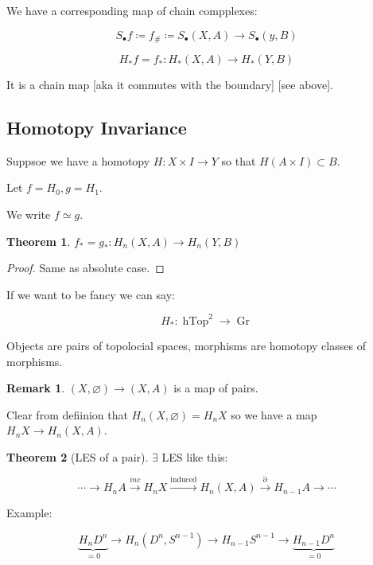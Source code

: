 \documentclass{article}
\theoremstyle{definition}
\newtheorem{theorem}{Theorem}
\newtheorem*{remark}{Remark}
\begin{document}
    We have a corresponding map of chain compplexes:

    \[
        S_\bullet f \coloneqq f_\# \coloneqq S_\bullet(X,A) \to S_\bullet(y,B)
    \]

    \[
        H_{\ast} f = f_{\ast} : H_{\ast} (X,A) \to H_{\ast} (Y,B)
    \]

    It is a chain map [aka it commutes with the boundary] [see above].

    \subsection*{Homotopy Invariance}

    Suppsoe we have a homotopy \(H: X \times I \to Y\) so that \(H(A \times I) \subset B\).
    
    Let \(f = H_0, g = H_1\).
    
    We write \(f\simeq g\).

    \begin{theorem}
        \(f_{\ast} = g_{\ast} : H_n(X,A) \to H_n(Y,B)\) 
    \end{theorem}

    \begin{proof}
        Same as absolute case.
    \end{proof}

    If we want to be fancy we can say:

    \[
        H_{\ast} : \operatorname{hTop}^2 \to \operatorname{Gr}  
    \]

    Objects are pairs of topolocial spaces, morphisms are homotopy classes of morphisms.

    \begin{remark}
        \((X,\varnothing) \to (X,A)\) is a map of pairs.

        Clear from defiinion that \(H_n (X,\varnothing) = H_n X\) so we have a map \(H_n X \to H_n(X,A)\).
    \end{remark}

    \begin{theorem}
        [LES of a pair] \(\exists\) LES like this:

        \[
            \cdots \to H_n A \xrightarrow{inc} H_n X \xrightarrow{\text{induced}} H_n (X,A) \xrightarrow{\partial} H_{n-1} A \to \cdots 
        \]
    \end{theorem}

    Example:

    \[
        \underbrace{H_n D^n}_{=0} \to H_n (D^n, S^{n-1}) \to H_{n-1} S^{n-1} \to \underbrace{H_{n-1}D^n}_{=0}
    \]
\end{document}
